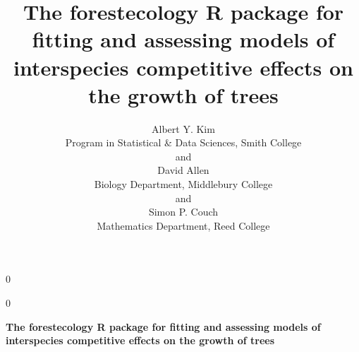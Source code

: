 \documentclass[12pt]{article}
\newcommand{\blind}{0}
\begin{document}
\def\spacingset#1{\renewcommand{\baselinestretch}%
{#1}\small\normalsize} \spacingset{1}



\blind
{
  \title{\bf The forestecology R package for fitting and assessing models of
interspecies competitive effects on the growth of trees}

  \author{
        Albert Y. Kim \\
    Program in Statistical \& Data Sciences, Smith College\\
     and \\     David Allen \\
    Biology Department, Middlebury College\\
     and \\     Simon P. Couch \\
    Mathematics Department, Reed College\\
      }
  \maketitle
} \fi

\blind
{
  \bigskip
  \bigskip
  \bigskip
  \begin{center}
    {\LARGE\bf The forestecology R package for fitting and assessing models of
interspecies competitive effects on the growth of trees}
  \end{center}
  \medskip
} \fi
\end{document}
